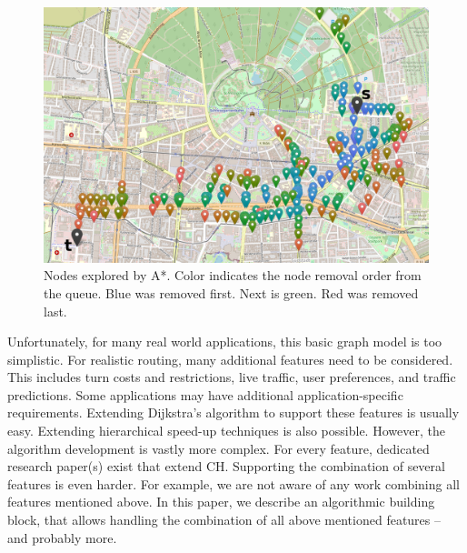 \documentclass[a4paper,UKenglish,cleveref, autoref, thm-restate]{lipics-v2021}
\begin{document}
\begin{figure}
\centering
\includegraphics[width=.6\columnwidth]{fig/searchspace_st.png}
\caption{Nodes explored by A*. Color indicates the node removal order from the queue. Blue was removed first. Next is green. Red was removed last.}
\label{img:search-space}
\end{figure}

Unfortunately, for many real world applications, this basic graph model is too simplistic.
For realistic routing, many additional features need to be considered.
This includes turn costs and restrictions, live traffic, user preferences, and traffic predictions. %
Some applications may have additional application-specific requirements.
Extending Dijkstra's algorithm to support these features is usually easy.
Extending hierarchical speed-up techniques is also possible.
However, the algorithm development is vastly more complex.
For every feature, dedicated research paper(s) exist that extend CH.
Supporting the combination of several features is even harder.
For example, we are not aware of any work combining all features mentioned above.
In this paper, we describe an algorithmic building block, that allows handling the combination of all above mentioned features -- and probably more.
\end{document}
